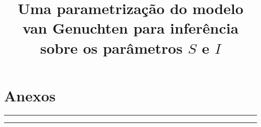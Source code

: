 \documentclass[10pt]{article}
\title{Uma parametrização do modelo van Genuchten para inferência sobre os parâmetros $S$ e $I$}
\date{}
\begin{document}
\maketitle

\begin{abstract}

\end{abstract}



\begin{singlespace}
\renewcommand\refname{}
\begin{flushleft}

\end{flushleft}
\end{singlespace}

% 

\section{Anexos}

\begin{singlespace}
\end{singlespace}
\noindent \rule[4mm]{\textwidth}{0.1ex}
\begin{small}
\linespread{0.7}
\vspace{-1cm}

\noindent \rule[4mm]{\textwidth}{0.1ex}
\end{small}

\def\capanexo{Conteúdo de água do solo (m$^3$ m$^{-3}$) em função da tensão matricial (kPa), da profundidade (cm)
 e da unidade experimental (UE) para amostras coletadas na}

\begin{sidewaystable}
 \caption{\capanexo{} entre linha.}\label{tab:anexoEL}
\begin{center}
 
\end{center}
\end{sidewaystable}

\begin{sidewaystable}
 \caption{\capanexo{} linha.}\label{tab:anexoL}
\begin{center}
 
\end{center}
\end{sidewaystable}
\end{document}
